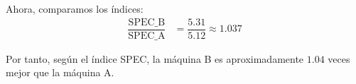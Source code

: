 \begin{ejercicio}
\begin{enumerate}
    Ahora, comparamos los índices:
    \begin{align*}
        \dfrac{\text{SPEC\_B}}{\text{SPEC\_A}} &= \dfrac{5.31}{5.12} \approx 1.037
    \end{align*}

    Por tanto, según el índice SPEC, la máquina B es aproximadamente $1.04$ veces mejor que la máquina A.
\end{enumerate}
\end{ejercicio}
\begin{comment}Sol:
1. Según el tiempo total de ejecución, la máquina A es 1,012 veces más rápida que B.
2. Los índices calculados a la manera de SPEC para las máquinas A y B son, respectivamente, 5,12 y 5,31; en consecuencia, según este índice la máquina B es 1,04 veces mejor que la A.
\end{comment}

